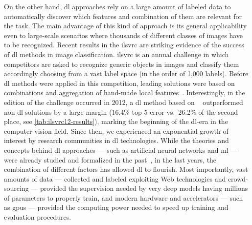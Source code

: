 On the other hand, \acrlong{dl} approaches rely on a large amount of labeled data to automatically discover which features and combination of them are relevant for the task.
The main advantage of this kind of approach is its general applicability even to large-scale scenarios where thousands of different classes of images have to be recognized.
Recent results in the \gls{ilsvrc} are striking evidence of the success of \gls{dl} methods in image classification.
\gls{ilsvrc} is an annual challenge in which competitors are asked to recognize generic objects in images and classify them accordingly choosing from a vast label space (in the order of 1,000 labels).
Before \gls{dl} methods were applied in this competition, leading solutions were based on combinations and aggregation of hand-made local features~\cite{harada2012graphical,akata2014good,sanchez2011high,mensink2012metric}.
Interestingly, in the edition of the challenge occurred in 2012, a \gls{dl} method based on ~\cite{krizhevsky2012imagenet} outperformed non-\gls{dl} solutions by a large margin (16.4\% top-5 error vs.\ 26.2\% of the second place, see \ref{tab:ilsvrc12-results}), marking the beginning of the \gls{dl}-era in the computer vision field.
Since then, we experienced an exponential growth of interest by research communities in \gls{dl} technologies.
While the theories and concepts behind \gls{dl} approaches --- such as artificial neural networks and \acrlong{ml} --- were already studied and formalized in the past~\cite{rosenblatt1958perceptron,rumelhart1985learning,lecun1989backpropagation,widrow199030}, in the last years, the combination of different factors has allowed \acrlong{dl} to flourish.
Most importantly, vast amounts of data --- collected and labeled exploiting Web technologies and crowd-sourcing --- provided the supervision needed by very deep models having millions of parameters to properly train, and modern hardware and accelerators --- such as \glspl{gpu} --- provided the computing power needed to speed up training and evaluation procedures.

